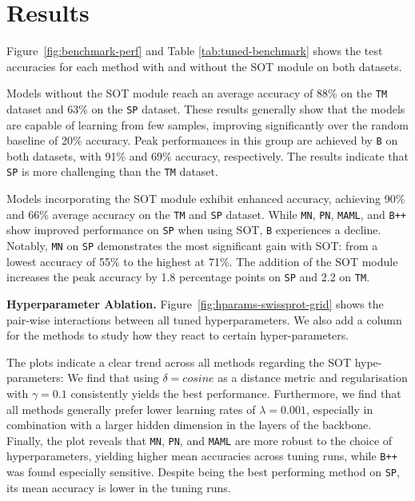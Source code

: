 \section{Results}


Figure~\ref{fig:benchmark-perf} and Table \ref{tab:tuned-benchmark} shows the test accuracies for each method with and without the SOT module on both datasets.

Models without the SOT module reach an average accuracy of 88\% on the \texttt{TM} dataset and 63\% on the \texttt{SP} dataset. These results generally show that the models are capable of learning from few samples, improving significantly over the random baseline of 20\% accuracy. Peak performances in this group are achieved by \texttt{B} on both datasets, with 91\% and 69\% accuracy, respectively. The results indicate that \texttt{SP} is more challenging than the \texttt{TM} dataset. 

Models incorporating the SOT module exhibit enhanced accuracy, achieving 90\% and 66\% average accuracy on the \texttt{TM} and \texttt{SP} dataset. While \texttt{MN}, \texttt{PN}, \texttt{MAML}, and \texttt{B++} show improved performance on \texttt{SP} when using SOT, \texttt{B} experiences a decline. Notably, \texttt{MN} on \texttt{SP} demonstrates the most significant gain with SOT: from a lowest accuracy of 55\% to the highest at 71\%. The addition of the SOT module increases the peak accuracy by 1.8 percentage points on \texttt{SP} and 2.2 on \texttt{TM}.

\textbf{Hyperparameter Ablation.} Figure~\ref{fig:hparams-swissprot-grid} shows the pair-wise interactions between all tuned hyperparameters. We also add a column for the methods to study how they react to certain hyper-parameters. 

The plots indicate a clear trend across all methods regarding the SOT hype-parameters: We find that using $\delta = cosine$ as a distance metric and regularisation with $\gamma = 0.1$ consistently yields the best performance. 
Furthermore, we find that all methods generally prefer lower learning rates of $\lambda=0.001$, especially in combination with a larger hidden dimension in the layers of the backbone. Finally, the plot reveals that \texttt{MN}, \texttt{PN}, and \texttt{MAML} are more robust to the choice of hyperparameters, yielding higher mean accuracies across tuning runs, while  \texttt{B++} was found especially sensitive. Despite being the best performing method on \texttt{SP}, its mean accuracy is lower in the tuning runs.


